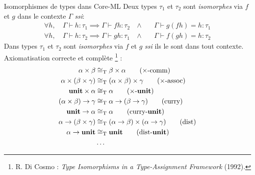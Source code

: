 \documentclass[serif]{beamer}
\newcommand{\ssi}{\textit{ssi}\xspace}
\newcommand{\unit}{\bold{unit}}
\newcommand{\T}{\mathrm{T}}
\begin{document}
\begin{frame}{Isomorphismes de types dans Core-ML}
\small
Deux types $\tau_1$ et $\tau_2$ sont \emph{isomorphes} via $f$ et $g$ dans le contexte $\Gamma$ \ssi :
\begin{align*}
    \forall h,\ &
    \Gamma \vdash h : \tau_1 \implies \Gamma \vdash f h : \tau_2 \ &
    \wedge\ &&
    \Gamma \vdash g (f h) = h : \tau_1
  \\
    \forall h,\ &
    \Gamma \vdash h : \tau_2 \implies \Gamma \vdash g h : \tau_1 \ &
    \wedge\ &&
    \Gamma \vdash f (g h) = h : \tau_2
\end{align*}
Dans types $\tau_1$ et $\tau_2$ sont \emph{isomorphes} via $f$ et $g$ \ssi ils le sont dans tout contexte. \\
Axiomatisation correcte et complète \footnote{R. Di Cosmo : \textit{Type Isomorphisms in a Type-Assignment Framework} (1992).} :
\begin{align*}
    \alpha \times \beta &\cong_\T
    \beta \times \alpha
    \label{prod_comm}
    \tag{$\times$-comm}
  \\
    \alpha \times (\beta \times \gamma) &\cong_\T
    (\alpha \times \beta) \times \gamma
    \label{prod_assoc}
    \tag{$\times$-assoc}
  \\
    \unit \times \alpha &\cong_\T
    \alpha
    \label{prod_unit}
    \tag{$\times$-$\unit$}
  \\
    (\alpha \times \beta) \rightarrow \gamma &\cong_\T
    \alpha \rightarrow (\beta \rightarrow \gamma)
    \label{curry}
    \tag{curry}
  \\
    \unit \rightarrow \alpha &\cong_\T
    \alpha
    \label{curry_unit}
    \tag{curry-$\unit$}
  \\
    \alpha \rightarrow (\beta \times \gamma) &\cong_\T
    (\alpha \rightarrow \beta) \times (\alpha \rightarrow \gamma)
    \label{dist}
    \tag{dist}
  \\
    \alpha \rightarrow \unit &\cong_\T
    \unit
    \label{dist_unit}
    \tag{dist-$\unit$}
  \\
    &\dots
\end{align*}
\end{frame}

\end{document}
